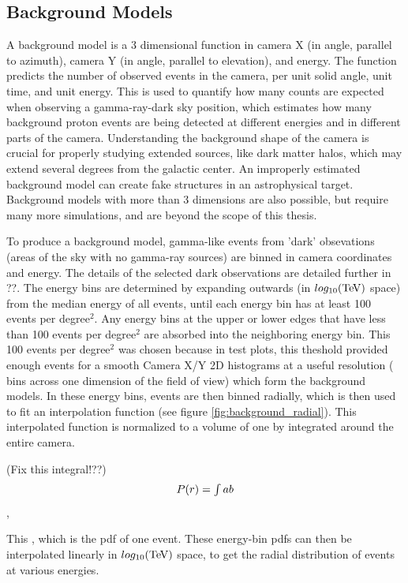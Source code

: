   \subsection{Background Models}\label{background_production}
    A background model is a 3 dimensional function in camera X (in angle, parallel to azimuth), camera Y (in angle, parallel to elevation), and energy.
    The function predicts the number of observed events in the camera, per unit solid angle, unit time, and unit energy.
    This is used to quantify how many counts are expected when observing a gamma-ray-dark sky position, which estimates how many background proton events are being detected at different energies and in different parts of the camera.
    Understanding the background shape of the camera is crucial for properly studying extended sources, like dark matter halos, which may extend several degrees from the galactic center.
    An improperly estimated background model can create fake structures in an astrophysical target.
    Background models with more than 3 dimensions are also possible, but require many more simulations, and are beyond the scope of this thesis.

    To produce a background model, gamma-like events from 'dark' obsevations (areas of the sky with no gamma-ray sources) are binned in camera coordinates and energy.
    The details of the selected dark observations are detailed further in ??.
    The energy bins are determined by expanding outwards (in $log_{10}(\TeV )$ space) from the median energy of all events, until each energy bin has at least 100 events per degree$^2$.
    Any energy bins at the upper or lower edges that have less than 100 events per degree$^2$ are absorbed into the neighboring energy bin.
    This 100 events per degree$^2$ was chosen because in test plots, this theshold provided enough events for a smooth Camera X/Y 2D histograms at a useful resolution ( bins across one dimension of the field of view) which form the background models.
    In these energy bins, events are then binned radially, which is then used to fit an interpolation function (see figure \ref{fig:background_radial}).
    This interpolated function is normalized to a volume of one by integrated around the entire camera.

    (Fix this integral!??)
    \begin{equation} \label{eqn:background_integral}
    $$ P(r) = \int{a}{b} $$
    \end{equation},

    This , which is the pdf of one event.
    These energy-bin pdfs can then be interpolated linearly in $log_{10}(\TeV )$ space, to get the radial distribution of events at various energies.

